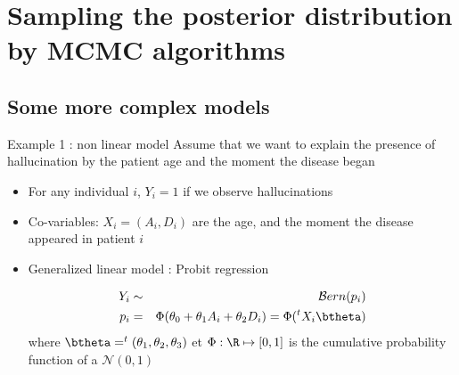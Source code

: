 
\section[MCMC]{Sampling the posterior distribution by MCMC algorithms} 
 \subsection{Some more complex models}
\begin{frame}{Example 1 : non linear model}
Assume that we want to explain  the presence of hallucination by the patient age and the moment the disease began 
  \begin{itemize}
 \item For any individual $i$, $Y_i  =1$ if we observe hallucinations
 \item Co-variables: $X_ i = (A_i, D_i)$ are the age, and the moment the disease appeared in patient $i$
 \item \vert Generalized linear model :  Probit regression  \noir 
 
\begin{eqnarray*}
Y_i &\sim& \mathcal{B}ern(p_i) \\
p_i&=& \Phi(\theta_0 + \theta_1 A_i + \theta_2 D_i) = \Phi(^tX_i \btheta)
\end{eqnarray*} 
where  $\btheta = ^t(\theta_1,\theta_2,\theta_3)$ et  $\Phi : \R \mapsto [0,1]$ is the cumulative probability function of a $\mathcal{N}(0,1)$
  \end{itemize}
 
 \end{frame}
